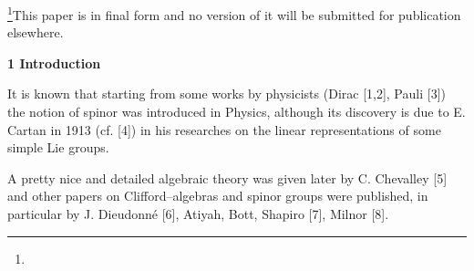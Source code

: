 \def\det{\hbox{\rm det}}
\def\Cl{\hbox{\it Cl}}
\def\Spin{\hbox{\it Spin}}
\def\Pin{\hbox{\it Pin}}
\def\Aut{\hbox{\it Aut}}


%

\def\spin{{\frak s\frak p\frak i\frak n}(p,q)}		%
\def\so{{\frak s\frak o}(p,q)}		  														%

%

\def\Real{I \!\! R}
\def\C{${\bf C}^n$}

\def\c{\cdot}
\def\ot{\otimes}
\def\rt{\rightarrow}
\def\ld{\ldots}

\def\ba{\begin{array}}
\def\ea{\end{array}}

\def\R{\hat{R}}
\def\I{\hat{I}}
\def\x{\hat{x}}
\def\A{\hat{A}}
\def\pih{\hat{\pi}}
\def\d{\hat{d}}
\def\al{\alpha}
\def\la{\lambda}

\footnote{}{This paper is in final form and no version of it will be
submitted for publication
 elsewhere.}



\vskip5pt\noindent
{\bf 1 Introduction}


It is known that starting from some works by physicists (Dirac [1,2], Pauli [3])
the notion of spinor was introduced in Physics, although
its discovery is due to E. Cartan in 1913 (cf. [4]) in his researches on the
linear  representations of some simple Lie groups.

\noindent A pretty nice and detailed algebraic theory was given later by
C. Chevalley [5] and other papers on Clifford--algebras and spinor groups were
published, in particular by J. Dieudonn\'e [6], Atiyah, Bott, Shapiro [7],
Milnor [8].


